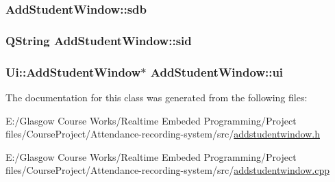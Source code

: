 \subsubsection[{sdb}]{ Add\+Student\+Window\+::sdb\hspace{0.3cm}{\ttfamily [private]}}\label{class_add_student_window_adf04fd6670ba62ad2a13094d212909c1}
\hypertarget{class_add_student_window_adb45ee9e1dc3ca24f730a8906d9c9d5f}{}
\subsubsection[{sid}]{\setlength{\rightskip}{0pt plus 5cm}Q\+String Add\+Student\+Window\+::sid\hspace{0.3cm}{\ttfamily [private]}}\label{class_add_student_window_adb45ee9e1dc3ca24f730a8906d9c9d5f}
\hypertarget{class_add_student_window_adc49461d9eefe5bd96e98493b8c7bea1}{}
\subsubsection[{ui}]{\setlength{\rightskip}{0pt plus 5cm}Ui\+::\+Add\+Student\+Window$\ast$ Add\+Student\+Window\+::ui\hspace{0.3cm}{\ttfamily [private]}}\label{class_add_student_window_adc49461d9eefe5bd96e98493b8c7bea1}


The documentation for this class was generated from the following files\+:\begin{DoxyCompactItemize}
\item 
E\+:/\+Glasgow Course Works/\+Realtime Embeded Programming/\+Project files/\+Course\+Project/\+Attendance-\/recording-\/system/src/\hyperlink{addstudentwindow_8h}{addstudentwindow.\+h}\item 
E\+:/\+Glasgow Course Works/\+Realtime Embeded Programming/\+Project files/\+Course\+Project/\+Attendance-\/recording-\/system/src/\hyperlink{addstudentwindow_8cpp}{addstudentwindow.\+cpp}\end{DoxyCompactItemize}
